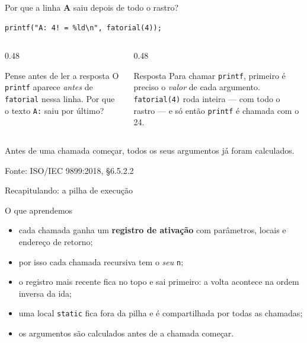 \documentclass[aspectratio=169]{beamer}
\newcommand{\fonte}[1]{\vfill\hfill{\scriptsize\textcolor{UFSGray}{Fonte: #1}}}
\begin{document}
\begin{frame}[fragile]{Por que a linha \textbf{A} saiu depois de todo o rastro?}
\begin{lstlisting}[style=tinyC]
printf("A: 4! = %ld\n", fatorial(4));
\end{lstlisting}
  \begin{columns}[T]
    \begin{column}{0.48\textwidth}
      \begin{block}{Pense antes de ler a resposta}
        \small O \texttt{printf} aparece \emph{antes} de \texttt{fatorial}
        nessa linha. Por que o texto \texttt{A:} saiu por último?
      \end{block}
    \end{column}
    \begin{column}{0.48\textwidth}
      \begin{block}{Resposta}
        \small Para chamar \texttt{printf}, primeiro é preciso o
        \emph{valor} de cada argumento. \texttt{fatorial(4)} roda
        inteira --- com todo o rastro --- e só então \texttt{printf}
        é chamada com o 24.
      \end{block}
    \end{column}
  \end{columns}
  \medskip
  \begin{center}
    \small Antes de uma chamada começar, todos os seus argumentos já foram
    calculados.
  \end{center}
  \fonte{ISO/IEC 9899:2018, §6.5.2.2~\cite{iso2018c17}}
\end{frame}

\begin{frame}{Recapitulando: a pilha de execução}
  \begin{block}{O que aprendemos}
    \begin{itemize}
      \item cada chamada ganha um \textbf{registro de ativação} com
        parâmetros, locais e endereço de retorno;
      \item por isso cada chamada recursiva tem o \emph{seu} \texttt{n};
      \item o registro mais recente fica no topo e sai primeiro: a volta
        acontece na ordem inversa da ida;
      \item uma local \texttt{static} fica fora da pilha e é compartilhada
        por todas as chamadas;
      \item os argumentos são calculados antes de a chamada começar.
    \end{itemize}
  \end{block}
\end{frame}
\end{document}
